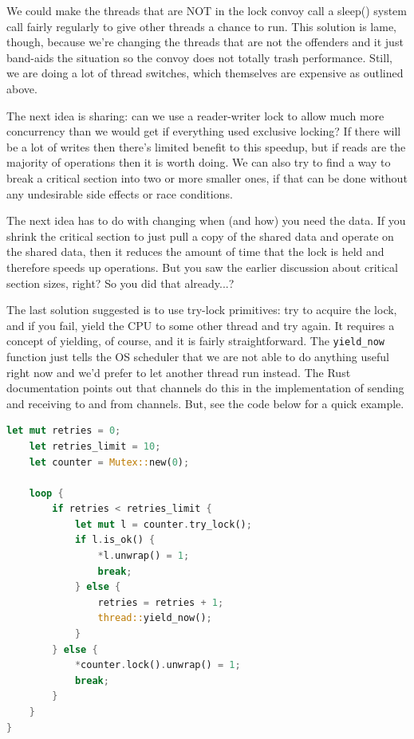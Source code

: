 \documentclass[a4paper]{report}
\begin{document}
We could make the threads that are NOT in the lock convoy call a sleep() system call fairly regularly to give other threads a chance to run. This solution is lame, though, because we're changing the threads that are not the offenders and it just band-aids the situation so the convoy does not totally trash performance. Still, we are doing a lot of thread switches, which themselves are expensive as outlined above.

The next idea is sharing: can we use a reader-writer lock to allow much more concurrency than we would get if everything used exclusive locking? If there will be a lot of writes then there's limited benefit to this speedup, but if reads are the majority of operations then it is worth doing. We can also try to find a way to break a critical section into two or more smaller ones, if that can be done without any undesirable side effects or race conditions.

The next idea has to do with changing when (and how) you need the data. If you shrink the critical section to just pull a copy of the shared data and operate on the shared data, then it reduces the amount of time that the lock is held and therefore speeds up operations. But you saw the earlier discussion about critical section sizes, right? So you did that already...?

The last solution suggested is to use try-lock primitives: try to acquire the lock, and if you fail, yield the CPU to some other thread and try again. It requires a concept of yielding, of course, and it is fairly straightforward. The \texttt{yield\_now} function just tells the OS scheduler that we are not able to do anything useful right now and we'd prefer to let another thread run instead. The Rust documentation points out that channels do this in the implementation of sending and receiving to and from channels. But, see the code below for a quick example.

\begin{lstlisting}[language=Rust]
    let mut retries = 0;
    let retries_limit = 10;
    let counter = Mutex::new(0);

    loop {
        if retries < retries_limit {
            let mut l = counter.try_lock();
            if l.is_ok() {
                *l.unwrap() = 1;
                break;
            } else {
                retries = retries + 1;
                thread::yield_now();
            }
        } else {
            *counter.lock().unwrap() = 1;
            break;
        }
    }
}
\end{lstlisting}
\end{document}
